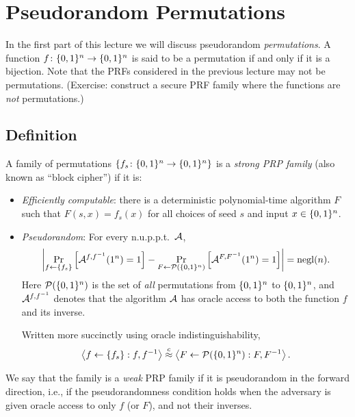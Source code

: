 \documentclass[11pt]{article}
\begin{document}
\thispagestyle{fancy}           %


\section{Pseudorandom Permutations}
\label{sec:pseud-perm}

In the first part of this lecture we will discuss pseudorandom
\emph{permutations}.  A function $f \colon \bit^n \to \bit^n$ is said
to be a permutation if and only if it is a bijection.  Note that the
PRFs considered in the previous lecture may not be permutations.
(Exercise: construct a secure PRF family where the functions are
\emph{not} permutations.)

\subsection{Definition}
\label{sec:definition}

\begin{definition}
  \label{def:prp}
  A family of permutations $\set{f_s \colon \bit^{n} \to \bit^{n}}$ is
  a \emph{strong PRP family} (also known as ``block cipher'') if it
  is:
  \begin{itemize}
  \item \emph{Efficiently computable}: there is a deterministic
    polynomial-time algorithm $F$ such that $F(s,x) = f_s(x)$ for all
    choices of seed $s$ and input $x \in \bit^{n}$.
  \item \emph{Pseudorandom}: For every n.u.p.p.t.~$\Adv$,
    \[ \abs*{ \Pr_{f \gets \set{f_{s}} } \left[ \Adv^{f,f^{-1}}
        (1^n) = 1 \right] - \Pr_{F \gets \mathcal{P}(\bit^n)} \left[
        \mathcal A^{F,F^{-1}} (1^n) = 1 \right] } = \negl(n). \] Here
    $\mathcal{P}(\bit^n)$ is the set of \emph{all} permutations from
    $\bit^n$ to $\bit^n$, and $\Adv^{f,f^{-1}}$ denotes that the
    algorithm $\Adv$ has oracle access to both the function $f$ and
    its inverse.

    Written more succinctly using oracle indistinguishability, \[
    \left\langle f \gets \set{f_{s}} : f, f^{-1} \right\rangle
    \compind \left\langle F \gets \mathcal{P}(\bit^{n}) : F, F^{-1}
    \right\rangle. \]
  \end{itemize}
  
  We say that the family is a \emph{weak} PRP family if it is
  pseudorandom in the forward direction, i.e., if the pseudorandomness
  condition holds when the adversary is given oracle access to only
  $f$ (or $F$), and not their inverses.
\end{definition}
\end{document}

